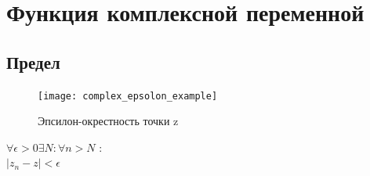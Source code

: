 \documentclass{article}
\begin{document}
         \section{Функция комплексной переменной}
            \subsection{Предел}
                \begin{figure}[h]
                  \texttt{[image: complex\_epsolon\_example]}
                  \caption{Эпсилон-окрестность точки z}
                  \label{ris:complex_epsolon_example}
                \end{figure}
                $\forall \epsilon > 0 \exists N : \forall n>N $ :\\
                $|z_{n}-z|<\epsilon$ 
\end{document}
